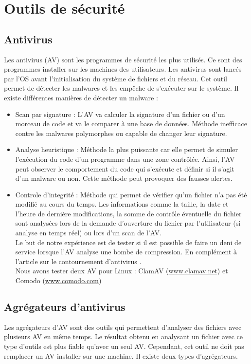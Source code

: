 \documentclass[smallextended]{svjour3}       %
\begin{document}
\section{Outils de sécurité}
\label{2.Outils}

\subsection{Antivirus}
\label{2.1antivirus}
Les antivirus (AV) sont les programmes de sécurité les plus utilisés. Ce sont des programmes installer sur les machines des utilisateurs. Les antivirus sont lancés par l'OS avant l'initialisation du système de fichiers et du réseau. Cet outil permet de détecter les malwares et les empêche de s’exécuter sur le système. Il existe différentes manières de détecter un malware : 
\begin{itemize}
\item Scan par signature : L'AV va calculer la signature d'un fichier ou d'un morceau de code et va le comparer à une base de données. Méthode inefficace contre les malwares polymorphes ou capable de changer leur signature.
\item Analyse heuristique : Méthode la plus puissante car elle permet de simuler l’exécution du code d'un programme dans une zone contrôlée. Ainsi, l'AV peut observer le comportement du code qui s’exécute et définir si il s'agit d'un malware ou non. Cette méthode peut provoquer des fausses alertes.
\item Controle d'integrité : Méthode qui permet de vérifier qu'un fichier n'a pas été modifié au cours du temps. Les informations comme la taille, la date et l'heure de dernière modifications, la somme de contrôle éventuelle du fichier sont analysées lors de la demande d'ouverture du fichier par l'utilisateur (si analyse en temps réel) ou lors d'un scan de l'AV.\\
Le but de notre expérience est de tester si il est possible de faire un deni de service lorsque l'AV analyse une bombe de compression. En complément à l'article sur le contournement d'antivirus \cite{Contournement}.\\
Nous avons tester deux AV pour Linux : ClamAV (\url{www.clamav.net}) et Comodo (\url{www.comodo.com})\\
\end{itemize}

\subsection{Agrégateurs d'antivirus}
\label{2.2agrégateurs}
Les agrégateurs d'AV sont des outils qui permettent d'analyser des fichiers avec plusieurs AV en même temps. Le résultat obtenu en analysant un fichier avec ce type d'outils est plus fiable qu'avec un seul AV. Cependant, cet outil ne doit pas remplacer un AV installer sur une machine. Il existe deux types d’agrégateurs. 
\end{document}
